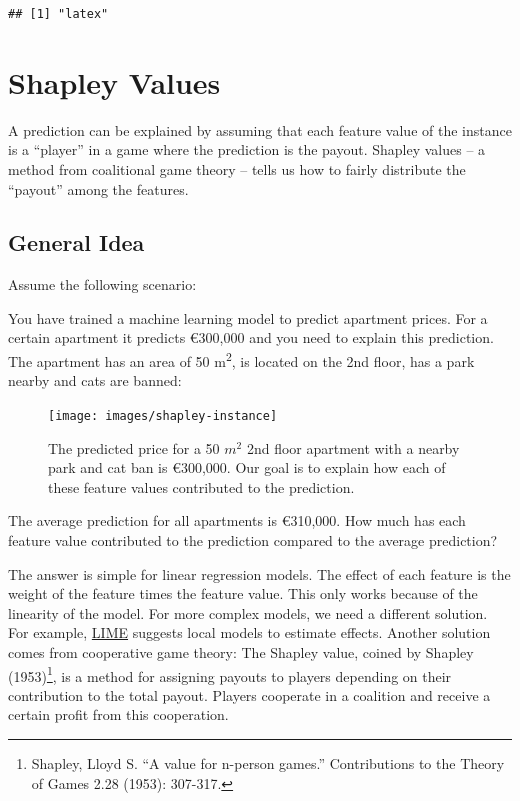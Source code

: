 \documentclass[
  11pt,
]{scrbook}
\begin{document}
\begin{verbatim}
## [1] "latex"
\end{verbatim}

\newpage

\hypertarget{shapley}{%
\section{Shapley Values}\label{shapley}}

A prediction can be explained by assuming that each feature value of the instance is a ``player'' in a game where the prediction is the payout.
Shapley values -- a method from coalitional game theory -- tells us how to fairly distribute the ``payout'' among the features.

\hypertarget{general-idea}{%
\subsection{General Idea}\label{general-idea}}

Assume the following scenario:

You have trained a machine learning model to predict apartment prices.
For a certain apartment it predicts €300,000 and you need to explain this prediction.
The apartment has an area of 50 m\textsuperscript{2}, is located on the 2nd floor, has a park nearby and cats are banned:

\begin{figure}

{\centering \texttt{[image: images/shapley-instance]} 

}

\caption{The predicted price for a 50 $m^2$ 2nd floor apartment with a nearby park and cat ban is €300,000. Our goal is to explain how each of these feature values contributed to the prediction.}\label{fig:shapley-instance}
\end{figure}

The average prediction for all apartments is €310,000.
How much has each feature value contributed to the prediction compared to the average prediction?

The answer is simple for linear regression models.
The effect of each feature is the weight of the feature times the feature value.
This only works because of the linearity of the model.
For more complex models, we need a different solution.
For example, \protect\hyperlink{lime}{LIME} suggests local models to estimate effects.
Another solution comes from cooperative game theory:
The Shapley value, coined by Shapley (1953)\footnote{Shapley, Lloyd S. ``A value for n-person games.'' Contributions to the Theory of Games 2.28 (1953): 307-317.}, is a method for assigning payouts to players depending on their contribution to the total payout.
Players cooperate in a coalition and receive a certain profit from this cooperation.
\end{document}
